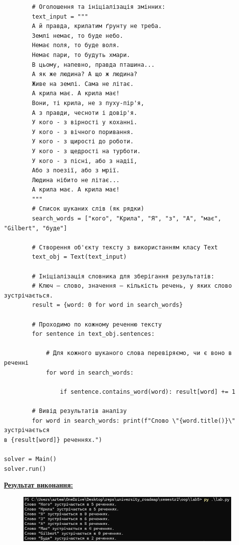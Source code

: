 \documentclass[12pt,a4paper]{article}
\begin{document}
{\begin{verbatim}
        # Оголошення та ініціалізація змінних:
        text_input = """
        А й правда, крилатим ґрунту не треба.
        Землі немає, то буде небо.
        Немає поля, то буде воля.
        Немає пари, то будуть хмари.
        В цьому, напевно, правда пташина...
        А як же людина? А що ж людина?
        Живе на землі. Сама не літає.
        А крила має. А крила має!
        Вони, ті крила, не з пуху-пір'я,
        А з правди, чесноти і довір'я.
        У кого - з вірності у коханні.
        У кого - з вічного поривання.
        У кого - з щирості до роботи.
        У кого - з щедрості на турботи.
        У кого - з пісні, або з надії,
        Або з поезії, або з мрії.
        Людина нібито не літає...
        А крила має. А крила має!
        """
        # Список шуканих слів (як рядки)
        search_words = ["кого", "Крила", "Я", "з", "А", "має", "Gilbert", "буде"]

        # Створення об'єкту тексту з використанням класу Text
        text_obj = Text(text_input)

        # Ініціалізація словника для зберігання результатів:
        # Ключ – слово, значення – кількість речень, у яких слово зустрічається.
        result = {word: 0 for word in search_words}

        # Проходимо по кожному реченню тексту
        for sentence in text_obj.sentences:

            # Для кожного шуканого слова перевіряємо, чи є воно в реченні
            for word in search_words:

                if sentence.contains_word(word): result[word] += 1

        # Вивід результатів аналізу
        for word in search_words: print(f"Слово \"{word.title()}\" зустрічається
в {result[word]} реченнях.")

solver = Main()
solver.run()

    \end{verbatim}}

    \textbf{\underline{Результат виконання:}}

    \begin{figure}[ht]
        \includegraphics[width=1\textwidth]{main.png}
    \end{figure}
\end{document}
